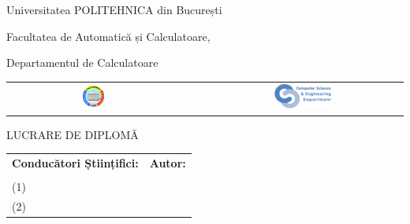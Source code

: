 \begin{titlepage}
	\begin{center}
		{\Large Universitatea POLITEHNICA din București}
		\par\vspace*{2mm}
		{\Large Facultatea de Automatică și Calculatoare,
		
		 Departamentul de Calculatoare}
		\par\vspace*{3mm}
		\begin{table}[h]
        	\begin{center}
				\begin{tabular}{cccc}
                    \includegraphics[width=0.13\textwidth]{src/img/branding/upb}
					& & &
					\includegraphics[width=0.30\textwidth]{src/img/branding/cs}
            	\end{tabular}
			\end{center}
		\end{table}
		
		\par\vspace*{35mm}
		{\Huge LUCRARE DE DIPLOMĂ}
		\par\vspace*{15mm}
		{\Huge \VARtitlero}
		\par\vspace*{35mm}
		\begin{table}[h]
        	\begin{center}
				\begin{tabular}{ll}
					\Large \textbf{\Large Conducători Științifici:}
					\vspace*{1mm} & \Large \textbf{\Large Autor:}\vspace*{1mm} \\
					\Large \VARadviser \vspace*{0.5mm} & \Large \VARauthor \vspace*{0.5mm} \\
					\Large \otheradvisers(1) \vspace*{0.5mm} & \vspace*{0.5mm} \\
					\Large \otheradvisers(2) \vspace*{0.5mm} & \vspace*{0.5mm}
				\end{tabular}
			\end{center}
		\end{table}

		\par\vspace*{35mm}
		\Large \VARtitlefooterro
	\end{center}
\end{titlepage}
